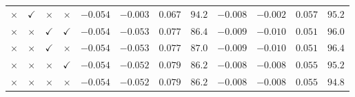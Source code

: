 \begin{table}
{\begin{tabular}{cccc rrrr rrrr}
  $\times$     & $\checkmark$ & $\times$     & $\times$     & $-0.054$ & $-0.003$ & $0.067$ & $94.2$ & $-0.008$ & $-0.002$ & $0.057$ & $95.2$ \\
  $\times$     & $\times$     & $\checkmark$ & $\checkmark$ & $-0.054$ & $-0.053$ & $0.077$ & $86.4$ & $-0.009$ & $-0.010$ & $0.051$ & $96.0$ \\
  $\times$     & $\times$     & $\checkmark$ & $\times$     & $-0.054$ & $-0.053$ & $0.077$ & $87.0$ & $-0.009$ & $-0.010$ & $0.051$ & $96.4$ \\
  $\times$     & $\times$     & $\times$     & $\checkmark$ & $-0.054$ & $-0.052$ & $0.079$ & $86.2$ & $-0.008$ & $-0.008$ & $0.055$ & $95.2$ \\
  $\times$     & $\times$     & $\times$     & $\times$     & $-0.054$ & $-0.052$ & $0.079$ & $86.2$ & $-0.008$ & $-0.008$ & $0.055$ & $94.8$ \\
  \bottomrule
\end{tabular}}
\end{table}

